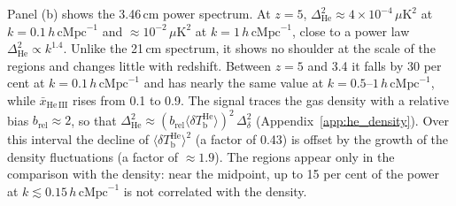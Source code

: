 
    \caption{Redshift evolution of the dimensionless power spectra of the doubly ionized helium fraction $\Delta^2_{x_\mathrm{He\,III}}(k)$ (panel a) and of the 3.46\,cm brightness temperature $\Delta^2_\mathrm{He}(k)$ (panel b, gas-cell maps). Colors indicate redshift from $z = 5$ (dark purple) to $z = 3.4$ (yellow), corresponding to a global ionized fraction $\bar{x}_\mathrm{He\,III}$ increasing from $0.1$ to $0.9$. Vertical dashed lines in panel (b) mark $k = 0.1$ (orange) and $0.5\,h\,\mathrm{cMpc}^{-1}$ (purple). Panel (c) shows $\Delta^2_\mathrm{He}$ at these two wavenumbers from $z = 6$ to $z = 3$, at the redshifts of the full snapshots.}



Panel (b) shows the 3.46\,cm power spectrum. At $z = 5$, $\Delta^2_\mathrm{He} \approx 4\times10^{-4}\,\mu\mathrm{K}^2$ at $k = 0.1\,h\,\mathrm{cMpc}^{-1}$ and $\approx 10^{-2}\,\mu\mathrm{K}^2$ at $k = 1\,h\,\mathrm{cMpc}^{-1}$, close to a power law $\Delta^2_\mathrm{He} \propto k^{1.4}$. Unlike the 21\,cm spectrum, it shows no shoulder at the scale of the  regions and changes little with redshift. Between $z = 5$ and 3.4 it falls by 30 per cent at $k = 0.1\,h\,\mathrm{cMpc}^{-1}$ and has nearly the same value at $k = 0.5$--$1\,h\,\mathrm{cMpc}^{-1}$, while $\bar{x}_\mathrm{He\,III}$ rises from 0.1 to 0.9. The signal traces the gas density with a relative bias $b_\mathrm{rel} \approx 2$, so that $\Delta^2_\mathrm{He} \approx (b_\mathrm{rel}\langle\delta T_\mathrm{b}^\mathrm{He}\rangle)^2\,\Delta^2_\delta$ (Appendix~\ref{app:he_density}). Over this interval the decline of $\langle\delta T_\mathrm{b}^\mathrm{He}\rangle^2$ (a factor of 0.43) is offset by the growth of the density fluctuations (a factor of $\approx 1.9$). The  regions appear only in the comparison with the density: near the midpoint, up to 15 per cent of the power at $k \lesssim 0.15\,h\,\mathrm{cMpc}^{-1}$ is not correlated with the density.

